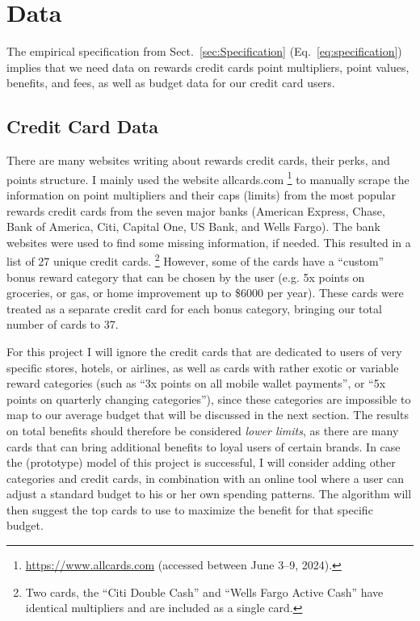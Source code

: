 \section{Data} \label{sec:Data}

The empirical specification from Sect.~\ref{sec:Specification} (Eq.~\ref{eq:specification}) implies that we need data on rewards credit cards point multipliers, point values, benefits, and fees, as well as budget data for our credit card users.

\subsection{Credit Card Data}

There are many websites writing about rewards credit cards, their perks, and points structure. 
I mainly used the website allcards.com%
\footnote{\url{https://www.allcards.com} (accessed between June 3--9, 2024).}
to manually scrape the information on point multipliers and their caps (limits) from the most popular rewards credit cards from the seven major banks (American Express, Chase, Bank of America, Citi, Capital One, US Bank, and Wells Fargo). 
The bank websites were used to find some missing information, if needed. 
This resulted in a list of 27 unique credit cards.%
\footnote{Two cards, the ``Citi Double Cash'' and ``Wells Fargo Active Cash'' have identical multipliers and are included as a single card.} 
However, some of the cards have a ``custom'' bonus reward category that can be chosen by the user (e.g. 5x points on groceries, or gas, or home improvement up to \$6000 per year). 
These cards were treated as a separate credit card for each bonus category, bringing our total number of cards to 37. 

For this project I will ignore the credit cards that are dedicated to users of very specific stores, hotels, or airlines, as well as cards with rather exotic or variable reward categories (such as ``3x points on all mobile wallet payments'', or ``5x points on quarterly changing categories''), since these categories are impossible to map to our average budget that will be discussed in the next section. 
The results on total benefits should therefore be considered \emph{lower limits}, as there are many cards that can bring additional benefits to loyal users of certain brands.
In case the (prototype) model of this project is successful, I will consider adding other categories and credit cards, in combination with an online tool where a user can adjust a standard budget to his or her own spending patterns. The algorithm will then suggest the top cards to use to maximize the benefit for that specific budget. 

